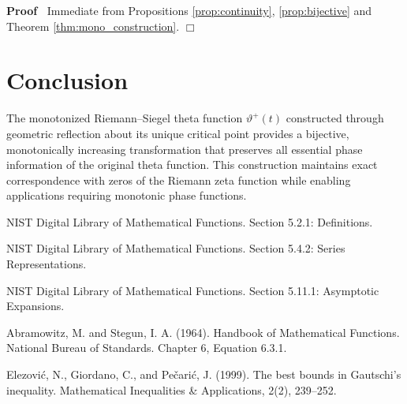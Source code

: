 \documentclass{article}
\newenvironment{proof}{\noindent\textbf{Proof\ }}{\hspace*{\fill}$\Box$\medskip}
\begin{document}
\begin{proof}
  Immediate from Propositions \ref{prop:continuity}, \ref{prop:bijective} and
  Theorem \ref{thm:mono_construction}.
\end{proof}

\section{Conclusion}

The monotonized Riemann--Siegel theta function $\vartheta^+ (t)$ constructed
through geometric reflection about its unique critical point provides a
bijective, monotonically increasing transformation that preserves all
essential phase information of the original theta function. This construction
maintains exact correspondence with zeros of the Riemann zeta function while
enabling applications requiring monotonic phase functions.

\begin{thebibliography}{99}
  {}NIST Digital Library of Mathematical Functions. Section
  5.2.1: Definitions.
  
  {}NIST Digital Library of Mathematical Functions. Section
  5.4.2: Series Representations.
  
  {}NIST Digital Library of Mathematical Functions.
  Section 5.11.1: Asymptotic Expansions.
  
  {}Abramowitz, M. and Stegun, I. A. (1964).
  Handbook of Mathematical Functions. National Bureau of Standards. Chapter 6,
  Equation 6.3.1.
  
  {}Elezovi{\'c}, N., Giordano, C., and Pe{\v
  c}ari{\'c}, J. (1999). The best bounds in Gautschi's inequality.
  Mathematical Inequalities \& Applications, 2(2), 239--252.
\end{thebibliography}

\
\end{document}
